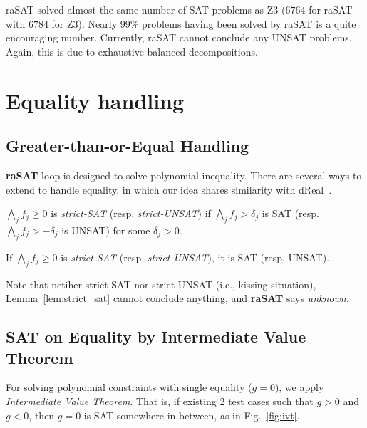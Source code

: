 \documentclass[runningheads,a4paper,oribibl]{llncs}
\begin{document}
raSAT solved almost the same number of SAT problems as Z3 ($6764$ for raSAT with $6784$ for Z3). Nearly $99\%$ problems having been solved by raSAT is a quite encouraging number. 
Currently, raSAT cannot conclude any UNSAT problems. Again, this is due to exhaustive balanced decompositions.





\section{Equality handling} \label{sec:equality}

\subsection{Greater-than-or-Equal Handling} \label{sec:geq}

{\bf raSAT} loop is designed to solve polynomial inequality. 
There are several ways to extend to handle equality, in which our idea shares similarity with 
dReal~\cite{dRealCADE13,dRealLICS12}. 

\begin{definition} \label{def:strict_unsat}
$\bigwedge \limits_{j} f_j \geq 0$ is 
{\em strict-SAT} (resp. {\em strict-UNSAT}) 
if $\bigwedge \limits_{j} f_j > \delta_j$ is SAT 
(resp. $\bigwedge \limits_{j} f_j > -\delta_j$ is UNSAT) for some $\delta_j >0$.
\end{definition}

\begin{lemma} \label{lem:strict_sat}
If $\bigwedge \limits_{j} f_j \geq 0$ is {\em strict-SAT} (resp. {\em strict-UNSAT}), 
it is SAT (resp. UNSAT).
\end{lemma}

Note that netiher strict-SAT nor strict-UNSAT (i.e., kissing situation), 
Lemma~\ref{lem:strict_sat} cannot conclude anything, and \textbf{raSAT} says {\em unknown}. 


\subsection{SAT on Equality by Intermediate Value Theorem} \label{sec:eq}
For solving polynomial constraints with single equality ($g=0$), we apply {\em Intermediate Value Theorem}. 
That is, if existing 2 test cases such that $g > 0$ and $g < 0$, then $g=0$ is SAT somewhere in between, 
as in Fig.~\ref{fig:ivt}. 
\end{document}
